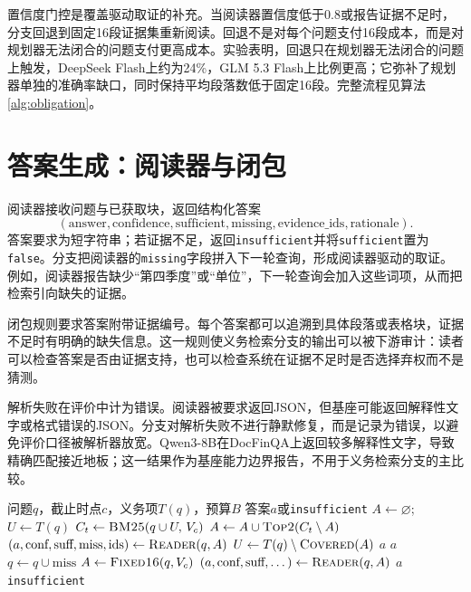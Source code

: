 置信度门控是覆盖驱动取证的补充。当阅读器置信度低于0.8或报告证据不足时，分支回退到固定16段证据集重新阅读。回退不是对每个问题支付16段成本，而是对规划器无法闭合的问题支付更高成本。实验表明，回退只在规划器无法闭合的问题上触发，DeepSeek Flash上约为24\%，GLM 5.3 Flash上比例更高；它弥补了规划器单独的准确率缺口，同时保持平均段落数低于固定16段。完整流程见算法\ref{alg:obligation}。



\section{答案生成：阅读器与闭包}

阅读器接收问题与已获取块，返回结构化答案
\begin{equation}
(\text{answer},\text{confidence},\text{sufficient},\text{missing},\text{evidence\_ids},\text{rationale}).
\end{equation}
答案要求为短字符串；若证据不足，返回\texttt{insufficient}并将\texttt{sufficient}置为\texttt{false}。分支把阅读器的\texttt{missing}字段拼入下一轮查询，形成阅读器驱动的取证。例如，阅读器报告缺少“第四季度”或“单位”，下一轮查询会加入这些词项，从而把检索引向缺失的证据。

闭包规则要求答案附带证据编号。每个答案都可以追溯到具体段落或表格块，证据不足时有明确的缺失信息。这一规则使义务检索分支的输出可以被下游审计：读者可以检查答案是否由证据支持，也可以检查系统在证据不足时是否选择弃权而不是猜测。

解析失败在评价中计为错误。阅读器被要求返回JSON，但基座可能返回解释性文字或格式错误的JSON。分支对解析失败不进行静默修复，而是记录为错误，以避免评价口径被解析器放宽。Qwen3-8B在DocFinQA上返回较多解释性文字，导致精确匹配接近地板；这一结果作为基座能力边界报告，不用于义务检索分支的主比较。

\begin{algorithm}[H]
\caption{义务检索的单轮取证}
\label{alg:obligation}
\begin{algorithmic}[1]
\Require 问题$q$，截止时点$c$，义务项$T(q)$，预算$B$
\Ensure 答案$a$或\texttt{insufficient}
\State $A\gets\varnothing$; $U\gets T(q)$
  \State $C_t\gets\textsc{BM25}(q\cup U,\,V_c)$
  \State $A\gets A\cup\textsc{Top2}(C_t\setminus A)$
  \State $(a,\text{conf},\text{suff},\text{miss},\text{ids})\gets\textsc{Reader}(q,A)$
  \State $U\gets T(q)\setminus\textsc{Covered}(A)$
    \State \Return $a$
  \EndIf
    \State \Return $a$
  \EndIf
  \State $q\gets q\cup\text{miss}$
\EndFor
\State $A\gets\textsc{Fixed16}(q,V_c)$
\State $(a,\text{conf},\text{suff},\dots)\gets\textsc{Reader}(q,A)$
  \State \Return $a$
\Else
  \State \Return \texttt{insufficient}
\EndIf
\end{algorithmic}
\end{algorithm}

